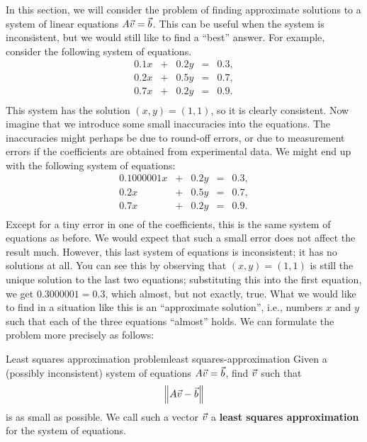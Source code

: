 \documentclass{ximera}
\begin{document}
In this section, we will consider the problem of finding approximate
solutions to a system of linear equations $A\vec{v}=\vec{b}$. This
can be useful when the system is inconsistent, but we would still like
to find a ``best'' answer. For example, consider the following system
of equations.
\begin{equation*}
  \begin{array}{rcrcl}
    0.1 x &+& 0.2 y &=& 0.3, \\
    0.2 x &+& 0.5 y &=& 0.7, \\
    0.7 x &+& 0.2 y &=& 0.9. \\
  \end{array}
\end{equation*}
This system has the solution $(x,y)=(1,1)$, so it is clearly
consistent. Now imagine that we introduce some small inaccuracies into
the equations. The inaccuracies might perhaps be due to round-off
errors, or due to measurement errors if the coefficients are obtained
from experimental data. We might end up with the following system of
equations:
\begin{equation*}
  \begin{array}{rcrcl}
    0.1000001 x &+& 0.2 y &=& 0.3, \\
    0.2 x &+& 0.5 y &=& 0.7, \\
    0.7 x &+& 0.2 y &=& 0.9. \\
  \end{array}
\end{equation*}
Except for a tiny error in one of the coefficients, this is the same
system of equations as before. We would expect that such a small error
does not affect the result much. However, this last system of
equations is inconsistent; it has no solutions at all. You can see
this by observing that $(x,y)=(1,1)$ is still the unique solution to
the last two equations; substituting this into the first equation, we
get $0.3000001 = 0.3$, which almost, but not exactly, true. What we
would like to find in a situation like this is an ``approximate
solution'', i.e., numbers $x$ and $y$ such that each of the three
equations ``almost'' holds. We can formulate the problem more
precisely as follows:

\begin{problem}{Least squares approximation problem}{least squares-approximation}
  Given a (possibly inconsistent) system of equations
  $A\vec{v}=\vec{b}$, find $\vec{v}$ such that
  \begin{equation*}
    \left\|A\vec{v} - \vec{b}\right\|
  \end{equation*}
  is as small as possible. We call such a vector $\vec{v}$ a
  \textbf{least squares approximation}%
   for the system of equations.
\end{problem}
\end{document}
